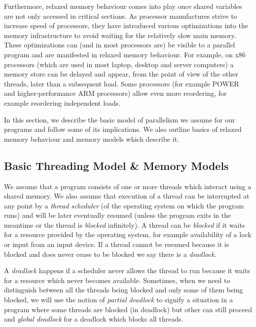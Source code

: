 Furthermore, relaxed memory behaviour comes into play once shared variables are
not only accessed in critical sections.
As processor manufactures strive to increase speed of processors, they have
introduced various optimizations into the memory infrastructure to avoid
waiting for the relatively slow main memory.
These optimizations can (and in most processors are) be visible to a parallel
program and are manifested in relaxed memory behaviour.
For example, on x86 processors (which are used in most laptop, desktop and
server computers) a memory store can be delayed and appear, from the point of
view of the other threads, later than a subsequent load.
Some processors (for example POWER and higher-performance ARM processors) allow
even more reordering, for example reordering independent loads.

In this section, we describe the basic model of parallelism we assume for our
programs and follow some of its implications.
We also outline basics of relaxed memory behaviour and memory models
which describe it.

\subsection{Basic Threading Model \& Memory Models}

We assume that a program consists of one or more threads which interact using a
shared memory.
We also assume that execution of a thread can be interrupted at any point by a
\emph{thread scheduler} (of the operating system on which the program runs) and
will be later eventually resumed (unless the program exits in the meantime or
the thread is \emph{blocked} infinitely).
A thread can be \emph{blocked} if it waits for a resource provided by the
operating system, for example availability of a lock or input from an input
device.
If a thread cannot be resumed because it is blocked and does never cease to be
blocked we say there is a \emph{deadlock}.

\begin{definition}\label{def:deadlock}
    A \emph{deadlock} happens if a scheduler never allows the thread to run
    because it waits for a resource which never becomes available.
    Sometimes, when we need to distinguish between all the threads being
    blocked and only some of them being blocked, we will use the notion of
    \emph{partial deadlock} to signify a situation in a program where some
    threads are blocked (in deadlock) but other can still proceed and
    \emph{global deadlock} for a deadlock which blocks all threads.
\end{definition}

